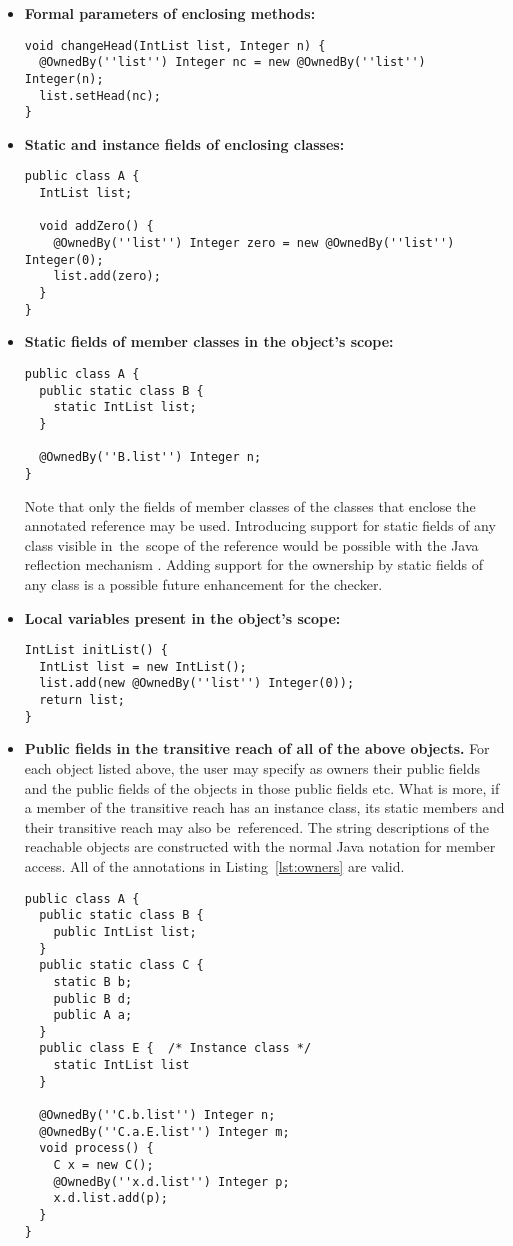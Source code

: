 \documentclass{pracamgr}
\theoremstyle{break}
\theoremstyle{break}
\theoremstyle{break}
\begin{document}
\begin{itemize}
\item \textbf{Formal parameters of enclosing methods:}
  \begin{lstlisting}
void changeHead(IntList list, Integer n) {
  @OwnedBy(''list'') Integer nc = new @OwnedBy(''list'') Integer(n);
  list.setHead(nc);
}
  \end{lstlisting}
\item \textbf{Static and instance fields of enclosing classes:}
  \begin{lstlisting}
public class A {
  IntList list;

  void addZero() {
    @OwnedBy(''list'') Integer zero = new @OwnedBy(''list'') Integer(0);
    list.add(zero);
  }
}
\end{lstlisting}
\item \textbf{Static fields of member classes in the object's scope:}
  \begin{lstlisting}
public class A {
  public static class B {
    static IntList list;
  }

  @OwnedBy(''B.list'') Integer n;
}
\end{lstlisting}
Note that only the fields of member classes of the classes that
enclose the annotated re\-fe\-ren\-ce may be used. Introducing support
for static fields of any class visible in~the~scope of the reference
would be possible with the Java reflection mechanism
\cite{reflection}. Adding support for the ownership by static fields
of any class is a possible future enhancement for the checker.
\item \textbf{Local variables present in the object's scope:}
\begin{lstlisting}
IntList initList() {
  IntList list = new IntList();
  list.add(new @OwnedBy(''list'') Integer(0)); 
  return list;
}
\end{lstlisting}
\item \textbf{Public fields in the transitive reach of all of the
  above objects.} For each object listed above, the user may specify
  as owners their public fields and the public fields of the objects
  in those public fields etc. What is more, if a member of the
  transitive reach has an instance class, its static members and their
  transitive reach may also be~referenced. The string descriptions of
  the reachable objects are constructed with the normal Java notation
  for member access. All of the annotations in
  Listing~\ref{lst:owners} are valid.
  \begin{lstlisting}[label={lst:owners}, 
      caption={\texttt{@OwnedBy} specifications}]
public class A {
  public static class B {
    public IntList list;
  }
  public static class C {
    static B b;
    public B d;
    public A a;
  }
  public class E {  /* Instance class */
    static IntList list
  }
  
  @OwnedBy(''C.b.list'') Integer n;   
  @OwnedBy(''C.a.E.list'') Integer m; 
  void process() {
    C x = new C();
    @OwnedBy(''x.d.list'') Integer p;
    x.d.list.add(p);
  }  
}
  \end{lstlisting}
\end{itemize}
\end{document}
